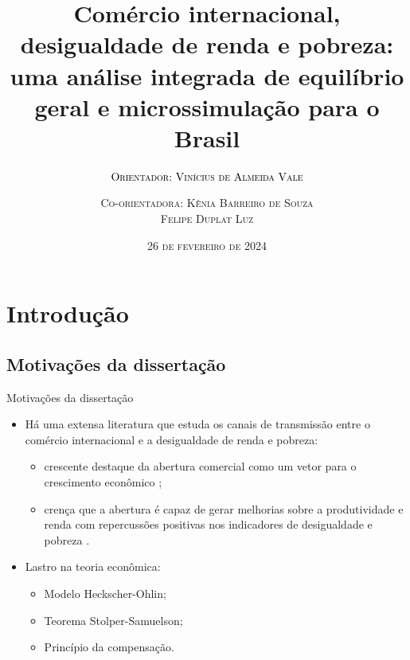 \documentclass[10pt]{sintefbeamer}
\title{\large Comércio internacional, desigualdade de renda e pobreza: uma análise integrada de equilíbrio geral e microssimulação para o Brasil}
\subtitle{\textsc{\textcolor{black}{Orientador: Vinícius de Almeida Vale}}}
\author{\textsc{Co-orientadora: Kênia Barreiro de Souza \\ Felipe Duplat Luz}}
\date{\textsc{26 de fevereiro de 2024}}
\begin{document}
\maketitle

\section{Introdução}

\subsection{Motivações da dissertação}

\begin{frame}{Motivações da dissertação}
	\begin{itemize}[<+->]
		\item Há uma extensa literatura que estuda os canais de transmissão entre o comércio internacional e a desigualdade de renda e pobreza:
		
		\begin{itemize}
			\item crescente destaque da abertura comercial como um vetor para o crescimento econômico \cite{atkin22};
			
			\item crença que a abertura é capaz de gerar melhorias sobre a produtividade e renda com repercussões positivas nos indicadores de desigualdade e pobreza \cite{carneiro06}.
		\end{itemize}
		
		\item Lastro na teoria econômica:
		
		\begin{itemize}
			\item Modelo Heckscher-Ohlin;
			\item Teorema Stolper-Samuelson;
			\item Princípio da compensação.
		\end{itemize}
	\end{itemize}
\end{frame}
\end{document}
